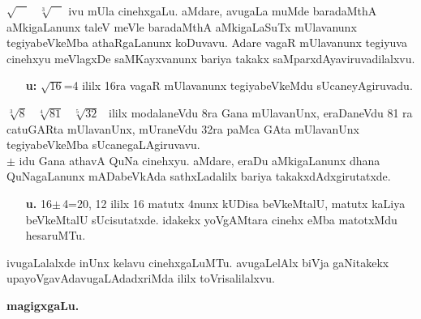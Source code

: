 $\sqrt{\phantom{W}}$ \  $\sqrt[\text{3}]{\phantom{W}}$ ivu mUla cinehxgaLu. aMdare, avugaLa muMde baradaMthA aMkigaLanunx taleV meVle baradaMthA aMkigaLaSuTx mUlavanunx tegiyabeVkeMba athaRgaLanunx koDuvavu. Adare vagaR mUlavanunx tegiyuva cinehxyu meVlagxDe saMKayxvanunx bariya takakx saMparxdAyaviruvadilalxvu.\\
\begin{itemize}
\item[{\bf u:}] $\sqrt{\text{16}}$=4 ililx 16ra vagaR mUlavanunx tegiyabeVkeMdu sUcaneyAgiruvadu.\\
\end{itemize}

$\sqrt[\text{3}]{\text{8}}$ \ $\sqrt[\text{4}]{\text{81}}$ \ $\sqrt[\text{5}]{\text{32}}$ \ ililx modalaneVdu 8ra Gana mUlavanUnx, eraDaneVdu  81 ra catuGARta mUlavanUnx, mUraneVdu 32ra paMca GAta mUlavanUnx tegiyabeVkeMba sUcanegaLAgiruvavu.\\

$\pm$ idu Gana athavA QuNa cinehxyu. aMdare, eraDu aMkigaLanunx dhana QuNagaLanunx mADabeVkAda sathxLadalilx bariya takakxdAdxgirutatxde.
\begin{itemize}
\item[{\bf u.}] 16$\pm\,$4=20, 12 ililx 16 matutx 4nunx kUDisa beVkeMtalU, matutx kaLiya beVkeMtalU sUcisutatxde. idakekx yoVgAMtara cinehx eMba matotxMdu hesaruMTu.
\end{itemize}

ivugaLalalxde inUnx kelavu cinehxgaLuMTu. avugaLelAlx biVja gaNitakekx upayoVgavAdavugaLAdadxriMda ililx toVrisalilalxvu.

\begin{center}
\bf{\large magigxgaLu.}
\end{center}

